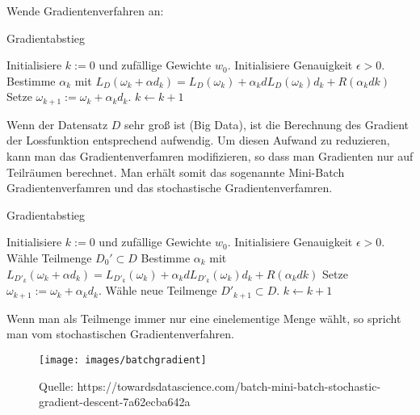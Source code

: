 Wende Gradientenverfahren an:

\begin{algorithm}
\caption{Gradientabstieg}
\begin{algorithmic}[1]
    \State Initialisiere $k:=0$ und zufällige Gewichte $w_0$.
\State Initialisiere Genauigkeit $\epsilon > 0$.
      
        \State Bestimme $\alpha_k$  mit $ L_D(\omega_k + \alpha d_k) =  L_D(\omega_k) + \alpha_k d L_D(\omega_k)d_k + R( \alpha_k dk)$ 
        \State Setze $\omega_{k+1} := \omega_k  + \alpha_k d_k$. 
 	\State  $k \leftarrow k+1$ 
    \EndWhile  \label{roy's loop}


\end{algorithmic}
\end{algorithm}

Wenn der Datensatz $D$ sehr groß ist (Big Data), ist die Berechnung des Gradient der Lossfunktion entsprechend aufwendig. Um diesen Aufwand zu reduzieren,
kann man das Gradientenverfamren modifizieren, so dass man Gradienten nur auf Teilräumen berechnet. Man erhält somit das sogenannte Mini-Batch Gradientenverfamren und das stochastische Gradientenverfamren.

\begin{algorithm}
\caption{Gradientabstieg}
\begin{algorithmic}[1]
    \State Initialisiere $k:=0$ und zufällige Gewichte $w_0$.
\State Initialisiere Genauigkeit $\epsilon > 0$.
\State Wähle Teilmenge $D_0' \subset D$
      
        \State Bestimme $\alpha_k$  mit $ L_{D'_k}(\omega_k + \alpha d_k) =  L_{D'_k}(\omega_k) + \alpha_k d L_{D'_k}(\omega_k)d_k + R( \alpha_k dk)$ 
        \State Setze $\omega_{k+1} := \omega_k  + \alpha_k d_k$. 
	\State Wähle neue Teilmenge $D'_{k +1} \subset D$.
 	\State  $k \leftarrow k+1$ 
    \EndWhile  \label{roy's loop}


\end{algorithmic}
\end{algorithm}

Wenn man als Teilmenge immer nur eine einelementige Menge wählt, so spricht man vom stochastischen Gradientenverfahren.

\begin{figure}[H]
      \centering
    \texttt{[image: images/batchgradient]}
      \caption{Quelle: https://towardsdatascience.com/batch-mini-batch-stochastic-gradient-descent-7a62ecba642a}
\end{figure}


